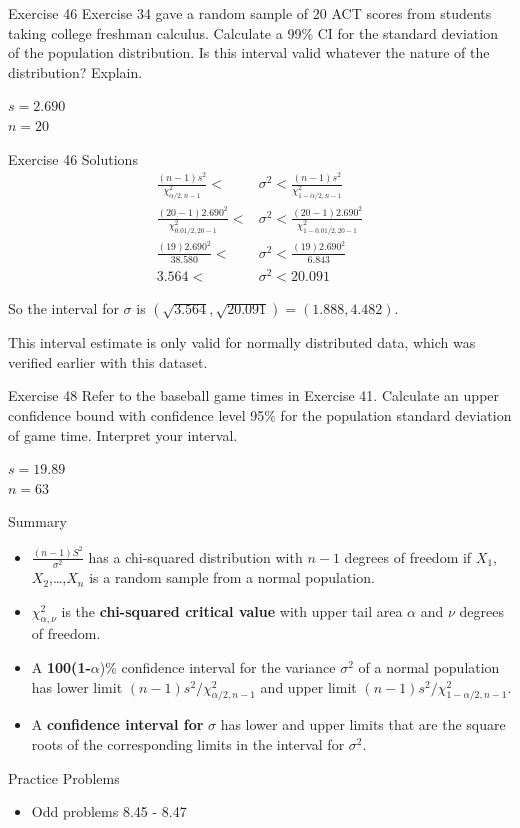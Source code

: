 \documentclass[
  ignorenonframetext,
]{beamer}
\providecommand{\tightlist}{%
  \setlength{\itemsep}{0pt}\setlength{\parskip}{0pt}}\usepackage{longtable,booktabs,array}
\begin{document}
\begin{frame}{Exercise 46}
\protect\hypertarget{exercise-46}{}
Exercise 34 gave a random sample of 20 ACT scores from students taking
college freshman calculus. Calculate a 99\% CI for the standard
deviation of the population distribution. Is this interval valid
whatever the nature of the distribution? Explain.

\(s = 2.690\)\\
\(n = 20\)
\end{frame}

\begin{frame}{Exercise 46 Solutions}
\protect\hypertarget{exercise-46-solutions}{}
\[
\begin{aligned}
\frac{(n-1)s^{2}}{\chi^{2}_{\alpha/2,n-1}} < &\sigma^{2} < \frac{(n-1)s^{2}}{\chi^{2}_{1-\alpha/2,n-1}}\\
\frac{(20-1)2.690^{2}}{\chi^{2}_{0.01/2,20-1}} < &\sigma^{2} < \frac{(20-1)2.690^{2}}{\chi^{2}_{1-0.01/2,20-1}} \\
\frac{(19)2.690^{2}}{38.580} < &\sigma^{2} < \frac{(19)2.690^{2}}{6.843} \\
3.564 < &\sigma^{2} < 20.091
\end{aligned}
\]

So the interval for \(\sigma\) is
\((\sqrt{3.564}, \sqrt{20.091}) = (1.888, 4.482)\).

This interval estimate is only valid for normally distributed data,
which was verified earlier with this dataset.
\end{frame}

\begin{frame}{Exercise 48}
\protect\hypertarget{exercise-48}{}
Refer to the baseball game times in Exercise 41. Calculate an upper
confidence bound with confidence level 95\% for the population standard
deviation of game time. Interpret your interval.

\(s = 19.89\)\\
\(n = 63\)
\end{frame}

\begin{frame}{Summary}
\protect\hypertarget{summary-6}{}
\begin{itemize}[<+->]
\tightlist
\item
  \(\frac{(n-1)S^{2}}{\sigma^{2}}\) has a chi-squared distribution with
  \(n-1\) degrees of freedom if \(X_{1}\), \(X_{2}\),\ldots,\(X_{n}\) is
  a random sample from a normal population.
\item
  \(\chi^{2}_{\alpha,\nu}\) is the \textbf{chi-squared critical value}
  with upper tail area \(\alpha\) and \(\nu\) degrees of freedom.
\item
  A \textbf{100(1-}\(\alpha\))\% confidence interval for the variance
  \(\sigma^{2}\) of a normal population has lower limit
  \((n-1)s^{2}/\chi^{2}_{\alpha/2,n-1}\) and upper limit
  \((n-1)s^{2}/\chi^{2}_{1-\alpha/2,n-1}\).
\item
  A \textbf{confidence interval for} \(\sigma\) has lower and upper
  limits that are the square roots of the corresponding limits in the
  interval for \(\sigma^{2}\).
\end{itemize}
\end{frame}

\begin{frame}{Practice Problems}
\protect\hypertarget{practice-problems-3}{}
\begin{itemize}[<+->]
\tightlist
\item
  Odd problems 8.45 - 8.47
\end{itemize}
\end{frame}
\end{document}
